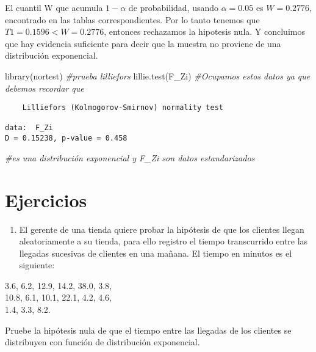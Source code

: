\documentclass[
  a4paper,
  oneside,
  openany]{book}
\newenvironment{Shaded}{\begin{snugshade}}{\end{snugshade}}
\newcommand{\CommentTok}[1]{\textcolor[rgb]{0.56,0.35,0.01}{\textit{#1}}}
\newcommand{\FunctionTok}[1]{\textcolor[rgb]{0.00,0.00,0.00}{#1}}
\newcommand{\NormalTok}[1]{#1}
\providecommand{\tightlist}{%
  \setlength{\itemsep}{0pt}\setlength{\parskip}{0pt}}
\begin{document}
El cuantil W que acumula \(1-\alpha\) de probabilidad, usando \(\alpha=0.05\) es \(W = 0.2776\), encontrado en las tablas correspondientes. Por lo tanto tenemos que \(T1=0.1596 < W=0.2776\), entonces rechazamos la hipotesis nula. Y concluimos que hay evidencia suficiente para decir que la muestra no proviene de una distribución exponencial.

\begin{Shaded}
\begin{Highlighting}[]
\FunctionTok{library}\NormalTok{(nortest) }\CommentTok{\#prueba lilliefors}
\FunctionTok{lillie.test}\NormalTok{(F\_Zi) }\CommentTok{\#Ocupamos estos datos ya que debemos recordar que }
\end{Highlighting}
\end{Shaded}

\begin{verbatim}
    Lilliefors (Kolmogorov-Smirnov) normality test

data:  F_Zi
D = 0.15238, p-value = 0.458
\end{verbatim}

\begin{Shaded}
\begin{Highlighting}[]
                   \CommentTok{\#es una distribución exponencial y F\_Zi son datos estandarizados }
\end{Highlighting}
\end{Shaded}

\hypertarget{ejercicios-15}{%
\section{Ejercicios}\label{ejercicios-15}}

\begin{enumerate}
\def\labelenumi{\arabic{enumi}.}
\tightlist
\item
  El gerente de una tienda quiere probar la hipótesis de que los clientes llegan aleatoriamente a su tienda, para ello registro el tiempo transcurrido entre las llegadas sucesivas de clientes en una mañana. El tiempo en minutos es el siguiente:
\end{enumerate}

3.6, 6.2, 12.9, 14.2, 38.0, 3.8,\\
10.8, 6.1, 10.1, 22.1, 4.2, 4.6,\\
1.4, 3.3, 8.2.

Pruebe la hipótesis nula de que el tiempo entre las llegadas de los clientes se distribuyen con función de distribución exponencial.
\end{document}
